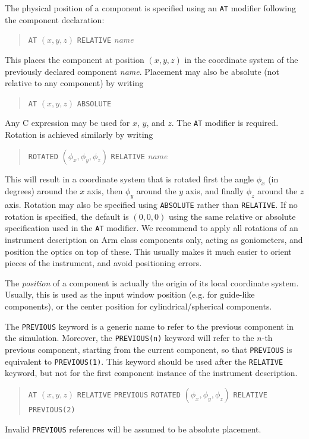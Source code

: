 The physical position of a component is specified using an \texttt{AT} modifier
following the component declaration:
  
\begin{quote}
  \texttt{AT} $(x,y,z)$ \texttt{RELATIVE} \textit{name}
\end{quote}
This places the component at position $(x,y,z)$ in the coordinate system
of the previously declared component \textit{name}. Placement may also
be absolute (not relative to any component) by writing
\begin{quote}
  \texttt{AT} $(x,y,z)$ \texttt{ABSOLUTE}
\end{quote}
Any C expression may be used for $x$, $y$, and $z$. The \texttt{AT}
modifier is required.
Rotation is achieved similarly by writing 
\begin{quote}
  \texttt{ROTATED} $(\phi_x,\phi_y,\phi_z)$ \texttt{RELATIVE} \textit{name}
\end{quote}
This will result in a coordinate system that is rotated first the angle
$\phi_x$ (in degrees) around the $x$ axis, then $\phi_y$ around the $y$ axis, and finally
$\phi_z$ around the $z$ axis. Rotation may also be specified using
\texttt{ABSOLUTE} rather than \texttt{RELATIVE}. If no rotation is
specified, the default is $(0,0,0)$ using the same relative or absolute
specification used in the \texttt{AT} modifier. We recommend to apply all rotations of an instrument description on Arm class components only, acting as goniometers, and position the optics on top of these. This usually makes it much easier to orient pieces of the instrument, and avoid positioning errors.

The \emph{position} of
a component is actually the origin of its local coordinate
system. Usually, this is used as the input window position (e.g. for
guide-like components), or the center position for
cylindrical/spherical components.

The \texttt{PREVIOUS}  keyword is a generic name to refer to the previous component in the simulation. Moreover, the \texttt{PREVIOUS(n)} keyword will refer to the $n$-th previous component, starting from the current component, so that \texttt{PREVIOUS} is equivalent to \texttt{PREVIOUS(1)}. This keyword should be used after the \texttt{RELATIVE} keyword, but not for the first component instance of the instrument description.
\begin{quote}
  \texttt{AT} $(x,y,z)$ \texttt{RELATIVE} \texttt{PREVIOUS}
  \texttt{ROTATED} $(\phi_x,\phi_y,\phi_z)$ \texttt{RELATIVE} \texttt{PREVIOUS(2)}
\end{quote}
Invalid \texttt{PREVIOUS} references will be assumed to be absolute placement.

